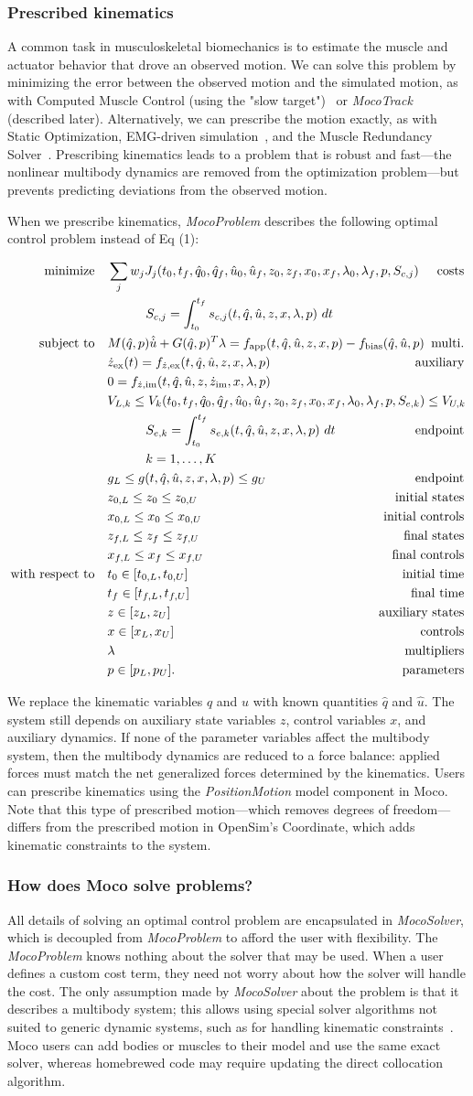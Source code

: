 \documentclass[10pt,letterpaper]{article}
\newcommand{\prescribed}{
\begin{align}
    \begin{aligned}
        \mbox{minimize} \quad & \sum_j w_j J_{j}(t_0, t_f, \hat{q}_0, \hat{q}_f, \hat{u}_0, \hat{u}_f, z_0, z_f, x_{0}, x_{f}, \lambda_0, \mathrlap{\lambda_f, p, S_{c,j})} & \textrm{costs} \\
        & \quad\quad\quad S_{c,j} = \int_{t_0}^{t_f} s_{c,j}(t, \hat{q}, \hat{u}, z, x, \lambda, p)~dt\\
        \mbox{subject to} \quad &
         M(\hat{q}, p)\hat{\dot{u}} + G(\hat{q}, p)^T \lambda = f_{\textrm{app}}(t, \hat{q}, \hat{u}, z, x, p) - \mathrlap{f_{\textrm{bias}}(\hat{q}, \hat{u}, p)} & \textrm{multi.} \\
        & \dot{z}_{\textrm{ex}}(t) = f_{\dot{z},\textrm{ex}}(t, \hat{q}, \hat{u}, z, x, \lambda, p) & \textrm{auxiliary} \\
        & 0 = f_{\dot{z},\textrm{im}}(t, \hat{q}, \hat{u}, z, \dot{z}_\textrm{im}, x, \lambda, p) \\
        & V_{L,k} \leq V_k(t_0, t_f, \hat{q}_0, \hat{q}_f, \hat{u}_0, \hat{u}_f, z_0, z_f, x_{0}, x_{f}, \lambda_0, \mathrlap{\lambda_f, p, S_{e,k}) \leq V_{U,k}} \\
        & \quad\quad\quad S_{e,k} = \int_{t_0}^{t_f} s_{e,k}(t, \hat{q}, \hat{u}, z, x, \lambda, p)~dt & \textrm{endpoint} \\
        & \quad\quad\quad k = 1, \ldots, K \\
        & g_{L} \leq g(t, \hat{q}, \hat{u}, z, x, \lambda, p) \leq g_{U} & \textrm{endpoint} \\
        & z_{0,L} \leq z_0 \leq z_{0,U} & \textrm{initial states} \\
        & x_{0,L} \leq x_0 \leq x_{0,U} & \textrm{initial controls}\\
        & z_{f,L} \leq z_f \leq z_{f,U} & \textrm{final states} \\
        & x_{f,L} \leq x_f \leq x_{f,U} & \textrm{final controls} \\
        \mbox{with respect to} \quad
        & t_0 \in [t_{0,L}, t_{0,U}] & \textrm{initial time} \\
        & t_f \in [t_{f,L}, t_{f,U}] & \textrm{final time} \\
        & z \in [z_{L}, z_{U}] & \textrm{auxiliary states} \\
        & x \in [x_{L}, x_{U}] & \textrm{controls} \\
        & \lambda & \textrm{multipliers} \\
        & p \in [p_{L}, p_{U}]. & \textrm{parameters}
    \end{aligned}
\end{align}
}
\begin{document}
\subsubsection*{Prescribed kinematics}

A common task in musculoskeletal biomechanics is to estimate the muscle and actuator behavior that drove an observed motion. We can solve this problem by minimizing the error between the observed motion and the simulated motion, as with Computed Muscle Control (using the "slow target")~\cite{Thelen:2003bba} or \textit{MocoTrack} (described later). Alternatively, we can prescribe the motion exactly, as with Static Optimization, EMG-driven simulation~\cite{Lloyd:2003}, and the Muscle Redundancy Solver~\cite{Groote:2016dq}. Prescribing kinematics leads to a problem that is robust and fast---the nonlinear multibody dynamics are removed from the optimization problem---but prevents predicting deviations from the observed motion.

When we prescribe kinematics, \textit{MocoProblem} describes the following optimal control problem instead of Eq (1):

\prescribed

We replace the kinematic variables $q$ and $u$ with known quantities $\hat{q}$ and $\hat{u}$. The system still depends on auxiliary state variables $z$, control variables $x$, and auxiliary dynamics. If none of the parameter variables affect the multibody system, then the multibody dynamics are reduced to a force balance: applied forces must match the net generalized forces determined by the kinematics. Users can prescribe kinematics using the \textit{PositionMotion} model component in Moco. Note that this type of prescribed motion---which removes degrees of freedom---differs from the prescribed motion in OpenSim’s Coordinate, which adds kinematic constraints to the system.

\subsubsection*{How does Moco solve problems?}

All details of solving an optimal control problem are encapsulated in \textit{MocoSolver}, which is decoupled from \textit{MocoProblem} to afford the user with flexibility. The \textit{MocoProblem} knows nothing about the solver that may be used. When a user defines a custom cost term, they need not worry about how the solver will handle the cost. The only assumption made by \textit{MocoSolver} about the problem is that it describes a multibody system; this allows using special solver algorithms not suited to generic dynamic systems, such as for handling kinematic constraints~\cite{Posa:2016}.
Moco users can add bodies or muscles to their model and use the same exact solver, whereas homebrewed code may require updating the direct collocation algorithm.
\end{document}
